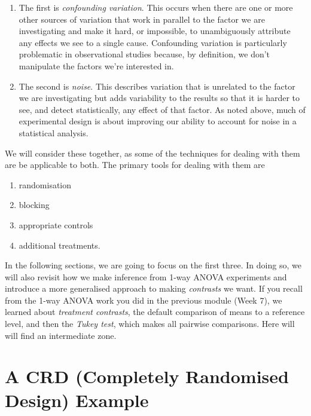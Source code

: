 \documentclass[
]{book}
\providecommand{\tightlist}{%
  \setlength{\itemsep}{0pt}\setlength{\parskip}{0pt}}
\begin{document}
\begin{enumerate}
\def\labelenumi{\arabic{enumi}.}
\item
  The first is \emph{confounding variation}. This occurs when there are one or more other sources of variation that work in parallel to the factor we are investigating and make it hard, or impossible, to unambiguously attribute any effects we see to a single cause. Confounding variation is particularly problematic in observational studies because, by definition, we don't manipulate the factors we're interested in.
\item
  The second is \emph{noise}. This describes variation that is unrelated to the factor we are investigating but adds variability to the results so that it is harder to see, and detect statistically, any effect of that factor. As noted above, much of experimental design is about improving our ability to account for noise in a statistical analysis.
\end{enumerate}

We will consider these together, as some of the techniques for dealing with them are be applicable to both. The primary tools for dealing with them are

\begin{enumerate}
\def\labelenumi{\arabic{enumi}.}
\tightlist
\item
  randomisation
\item
  blocking
\item
  appropriate controls
\item
  additional treatments.
\end{enumerate}

In the following sections, we are going to focus on the first three. In doing so, we will also revisit how we make inference from 1-way ANOVA experiments and introduce a more generalised approach to making \emph{contrasts} we want. If you recall from the 1-way ANOVA work you did in the previous module (Week 7), we learned about \emph{treatment contrasts}, the default comparison of means to a reference level, and then the \emph{Tukey test}, which makes all pairwise comparisons. Here will will find an intermediate zone.

\hypertarget{a-crd-completely-randomised-design-example}{%
\section{A CRD (Completely Randomised Design) Example}\label{a-crd-completely-randomised-design-example}}
\end{document}
